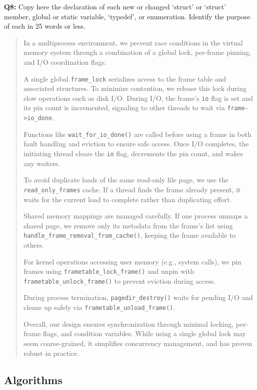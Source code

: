 \documentclass[a4paper,11pt]{paper}
\begin{document}
\textbf{Q8:} Copy here the declaration of each new or changed `struct' or `struct' member, global or static variable, `typedef', or enumeration.  Identify the purpose of each in 25 words or less.
\begin{quote}
  In a multiprocess environment, we prevent race conditions in the virtual memory system through a combination of a global lock, per-frame pinning, and I/O coordination flags.

A single global \texttt{frame\_lock} serializes access to the frame table and associated structures. To minimize contention, we release this lock during slow operations such as disk I/O. During I/O, the frame’s \texttt{io} flag is set and its pin count is incremented, signaling to other threads to wait via \texttt{frame->io\_done}.

Functions like \texttt{wait\_for\_io\_done()} are called before using a frame in both fault handling and eviction to ensure safe access. Once I/O completes, the initiating thread clears the \texttt{io} flag, decrements the pin count, and wakes any waiters.

To avoid duplicate loads of the same read-only file page, we use the \texttt{read\_only\_frames} cache. If a thread finds the frame already present, it waits for the current load to complete rather than duplicating effort.

Shared memory mappings are managed carefully. If one process unmaps a shared page, we remove only its metadata from the frame’s list using \texttt{handle\_frame\_removal\_from\_cache()}, keeping the frame available to others.

For kernel operations accessing user memory (e.g., system calls), we pin frames using \texttt{frametable\_lock\_frame()} and unpin with \texttt{frametable\_unlock\_frame()} to prevent eviction during access.

During process termination, \texttt{pagedir\_destroy()} waits for pending I/O and cleans up safely via \texttt{frametable\_unload\_frame()}.

Overall, our design ensures synchronization through minimal locking, per-frame flags, and condition variables. While using a single global lock may seem coarse-grained, it simplifies concurrency management, and has proven robust in practice.

\end{quote}

\pagebreak

\subsection{Algorithms}
\end{document}
